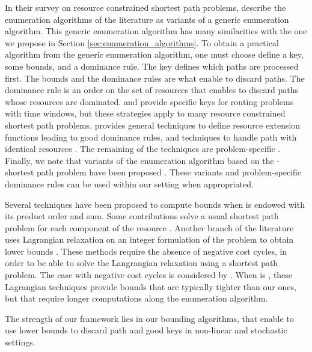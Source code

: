 \documentclass[11pt]{amsart}
\theoremstyle{plain}
\theoremstyle{remark}
\begin{document}
In their survey on resource constrained shortest path problems, \citet{irnich2005shortest} describe the enumeration algorithms of the literature as variants of a generic enumeration algorithm. This generic enumeration algorithm has many similarities with the one we propose in Section \ref{sec:enumeration_algorithms}. To obtain a practical algorithm from the generic enumeration algorithm, one must choose define a key, some bounds, and a dominance rule. The key defines which paths are processed first. The bounds and the dominance rules are what enable to discard paths. The dominance rule is an order on the set of resources that enables to discard paths whose resources are dominated. \citet{desrochers1988generalized} and \cite{powell1998generalized} provide specific keys for routing problems with time windows, but these strategies apply to many resource constrained shortest path problems. \citet{irnich2008resource} provides general techniques to define resource extension functions leading to good dominance rules, and techniques to handle path with identical resources \citep{irnich2006shortest}. The remaining of the techniques are problem-specific \cite{beasley1989algorithm,feillet2004exact,kohl19992,larsen1999parallelization,irnich2006shortest,ioachim1998dynamic}. Finally, we note that variants of the enumeration algorithm based on the -shortest path problem \citep{eppstein1998finding} have been proposed \cite{handler1980dual,beasley1989algorithm,santos2007improved}. These variants and problem-specific dominance rules can be used within our setting when appropriated.

Several techniques have been proposed to compute bounds when  is  endowed with its product order and sum. Some contributions solve a usual shortest path problem for each component of the resource \cite{joksch1966shortest,desrochers1988generalized,dumitrescu2003improved,lozano2013exact}. Another branch of the literature uses Lagrangian relaxation on an integer formulation of the problem to obtain lower bounds \cite{handler1980dual,santos2007improved,carlyle2008lagrangian,dumitrescu2003improved}. These methods require the absence of negative cost cycles, in order to be able to solve the Langrangian relaxation using a shortest path problem. The case with negative cost cycles is considered by \citet{feillet2004exact}. When  is , these Lagrangian techniques provide bounds that are typically tighter than our ones, but that require longer computations along the enumeration algorithm. 

The strength of our framework lies in our bounding algorithms, that enable to use lower bounds to discard path and good keys in non-linear and stochastic settings. 
\end{document}
